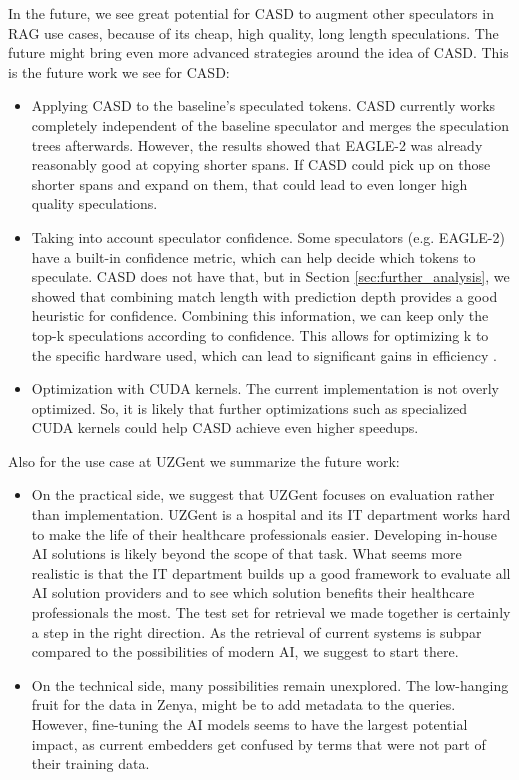 In the future, we see great potential for CASD to augment other speculators in RAG use cases, because of its cheap, high quality, long length speculations. The future might bring even more advanced strategies around the idea of CASD. This is the future work we see for CASD:
\begin{itemize}
    \item Applying CASD to the baseline's speculated tokens. CASD currently works completely independent of the baseline speculator and merges the speculation trees afterwards. However, the results showed that EAGLE-2 was already reasonably good at copying shorter spans. If CASD could pick up on those shorter spans and expand on them, that could lead to even longer high quality speculations.
    \item Taking into account speculator confidence. Some speculators (e.g. EAGLE-2) have a built-in confidence metric, which can help decide which tokens to speculate. CASD does not have that, but in Section \ref{sec:further_analysis}, we showed that combining match length with prediction depth provides a good heuristic for confidence. Combining this information, we can keep only the top-k speculations according to confidence. This allows for optimizing k to the specific hardware used, which can lead to significant gains in efficiency \cite{fernandez2025energy}.
    \item Optimization with CUDA kernels. The current implementation is not overly optimized. So, it is likely that further optimizations such as specialized CUDA kernels could help CASD achieve even higher speedups.
\end{itemize}

Also for the use case at UZGent we summarize the future work:
\begin{itemize}
    \item On the practical side, we suggest that UZGent focuses on evaluation rather than implementation. UZGent is a hospital and its IT department works hard to make the life of their healthcare professionals easier. Developing in-house AI solutions is likely beyond the scope of that task. What seems more realistic is that the IT department builds up a good framework to evaluate all AI solution providers and to see which solution benefits their healthcare professionals the most. The test set for retrieval we made together is certainly a step in the right direction. As the retrieval of current systems is subpar compared to the possibilities of modern AI, we suggest to start there.
    \item On the technical side, many possibilities remain unexplored. The low-hanging fruit for the data in Zenya, might be to add metadata to the queries. However, fine-tuning the AI models seems to have the largest potential impact, as current embedders get confused by terms that were not part of their training data.
\end{itemize}
